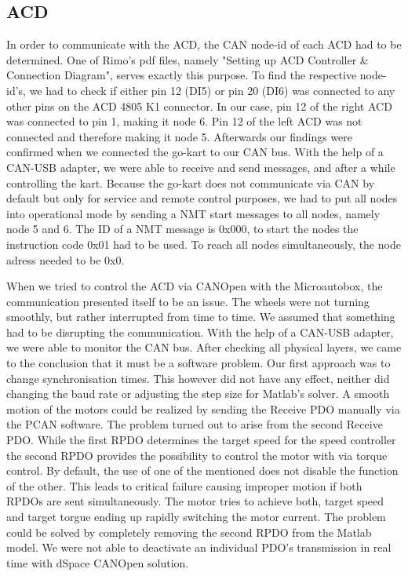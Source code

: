\subsection{ACD}




In order to communicate with the ACD, the CAN node-id of each ACD had to be determined. One of Rimo's pdf files, namely "Setting up ACD Controller \& Connection Diagram", serves exactly this purpose. 
To find the respective node-id's, we had to check if either pin 12 (DI5) or pin 20 (DI6) was connected to any other pins on the ACD 4805 K1 connector. In our case, pin 12 of the right ACD was connected to pin 1, making it node 6. Pin 12 of the left ACD was not connected and therefore making it node 5. Afterwards our findings were confirmed when we connected the go-kart to our CAN bus. With the help of a CAN-USB adapter, we were able to receive and send messages, and after a while controlling the kart.
Because the go-kart does not communicate via CAN by default but only for service and remote control purposes, we had to put all nodes into operational mode by sending a NMT start messages to all nodes, namely node 5 and 6.
The ID of a NMT message is 0x000, to start the nodes the instruction code 0x01 had to be used. To reach all nodes simultaneously, the node adress needed to be 0x0. 


When we tried to control the ACD via CANOpen with the Microautobox, the communication presented itself to be an issue. The wheels were not turning smoothly, but rather interrupted from time to time. We assumed that something had to be disrupting the communication.
With the help of a CAN-USB adapter, we were able to monitor the CAN bus. After checking all physical layers, we came to the conclusion that it must be a software problem. Our first approach was to change synchronisation times. This however did not have any effect, neither did changing the baud rate or adjusting the step size for Matlab's solver.
A smooth motion of the motors could be realized by sending the Receive PDO manually via the PCAN software. The problem turned out to arise from the second Receive PDO. While the first RPDO determines the target speed for the speed controller the second RPDO provides the possibility to control the motor with via torque control. By default, the use of one of the mentioned does not disable the function of the other. This leads to critical failure causing improper motion if both RPDOs are sent simultaneously. The motor tries to achieve both, target speed and target torgue ending up rapidly switching the motor current. The problem could be solved by completely removing the second RPDO from the Matlab model. We were not able to deactivate an individual PDO's transmission in real time with dSpace CANOpen solution.



